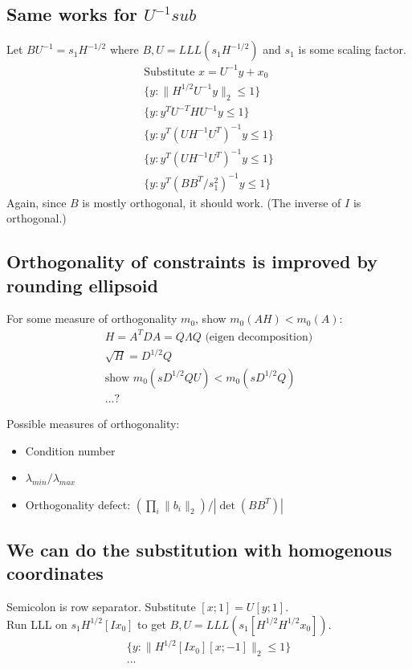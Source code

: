\documentclass[11pt]{article}
\theoremstyle{definition}
\theoremstyle{remark}
\begin{document}
\subsection{Same works for $U^{-1} sub$}
Let $BU^{-1}=s_1 H^{-1/2}$ where $B,U=LLL(s_1 H^{-1/2})$ and $s_1$ is some scaling factor.
\begin{align}
    \text{Substitute } x = U^{-1}y + x_0 \\
    \{y : \| H^{1/2} U^{-1} y \|_2 \leq 1 \} \\
    \{y : y^T U^{-T} H U^{-1} y  \leq 1 \} \\
    \{y : y^T (U H^{-1} U^T)^{-1} y  \leq 1 \} \\
    \{y : y^T (U H^{-1} U^T)^{-1} y  \leq 1 \} \\
    \{y : y^T (BB^T / s_1^2)^{-1} y  \leq 1 \}
\end{align}
Again, since $B$ is mostly orthogonal, it should work. (The inverse of $I$ is orthogonal.)

\subsection{Orthogonality of constraints is improved by rounding ellipsoid}
For some measure of orthogonality $m_0$, show $m_0(AH) < m_0(A)$:
\begin{align}
    H = A^T D A = Q \Lambda Q \text{ (eigen decomposition)} \\
    \sqrt{H} = D^{1/2} Q \\
    \text{show } m_0(sD^{1/2} Q U) < m_0(sD^{1/2} Q) \\
    ... ?
\end{align}

Possible measures of orthogonality:
\begin{itemize}[noitemsep]
    \item Condition number
    \item $\lambda_{min} / \lambda_{max}$
    \item Orthogonality defect: $\left( \prod_i \|b_i\|_2 \right) / |\det(BB^T)|$
\end{itemize}

\subsection{We can do the substitution with homogenous coordinates}
Semicolon is row separator. Substitute $[x; 1] = U[y; 1]$.\\
Run LLL on $s_1 H^{1/2} [I x_0]$ to get $B, U = LLL(s_1 [H^{1/2} H^{1/2}x_0])$.
\begin{align}
    \{y : \| H^{1/2} [I x_0][x; -1] \|_2 \leq 1 \} \\
    ...
\end{align}
\end{document}
